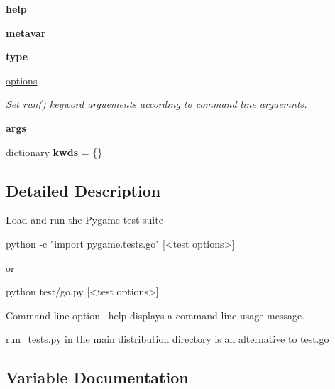 \begin{DoxyCompactItemize}
\mbox{\label{namespacepygame_1_1tests_1_1____main_____a07d9fa9698b273ca29316b3e18f2cdbb}} 
{\bfseries help}
\item 
\mbox{\label{namespacepygame_1_1tests_1_1____main_____a12210df11dbcec35f5ed208b75069d9b}} 
{\bfseries metavar}
\item 
\mbox{\label{namespacepygame_1_1tests_1_1____main_____a7cff62827d43355a6ccacef98d233d2f}} 
{\bfseries type}
\item 
\hyperlink{namespacepygame_1_1tests_1_1____main_____afb8ede7be60bf8d9392a0332432c16c1}{options}
\begin{DoxyCompactList}\small\item\em Set run() keyword arguements according to command line arguemnts. \end{DoxyCompactList}\item 
\mbox{\label{namespacepygame_1_1tests_1_1____main_____a35d13cabfe5d65b2c0f3f4fa074b8fcb}} 
{\bfseries args}
\item 
\mbox{\label{namespacepygame_1_1tests_1_1____main_____a1236be0e7bc9e7c81e87b25b3803418f}} 
dictionary {\bfseries kwds} = \{\}
\end{DoxyCompactItemize}


\subsection{Detailed Description}
\begin{DoxyVerb}Load and run the Pygame test suite

python -c "import pygame.tests.go" [<test options>]

or

python test/go.py [<test options>]

Command line option --help displays a command line usage message.

run_tests.py in the main distribution directory is an alternative to test.go\end{DoxyVerb}
 

\subsection{Variable Documentation}
\mbox{\label{namespacepygame_1_1tests_1_1____main_____a451b974f602f9bb00c3cb2d41b6bccd8}} 
